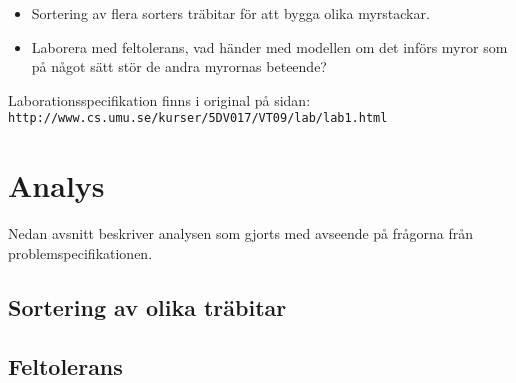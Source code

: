 \documentclass[titlepage, a4paper, 12pt]{article}
\begin{document}
\begin{itemize}
\item Sortering av flera sorters träbitar för att bygga olika
  myrstackar.
\item Laborera med feltolerans, vad händer med modellen om det införs
  myror som på något sätt stör de andra myrornas beteende?
\end{itemize}

Laborationsspecifikation finns i original på sidan:\\
\verb!http://www.cs.umu.se/kurser/5DV017/VT09/lab/lab1.html!

\section{Analys}
Nedan avsnitt beskriver analysen som gjorts med avseende på frågorna
från problemspecifikationen.

\subsection{Sortering av olika träbitar}


\subsection{Feltolerans}
\end{document}
